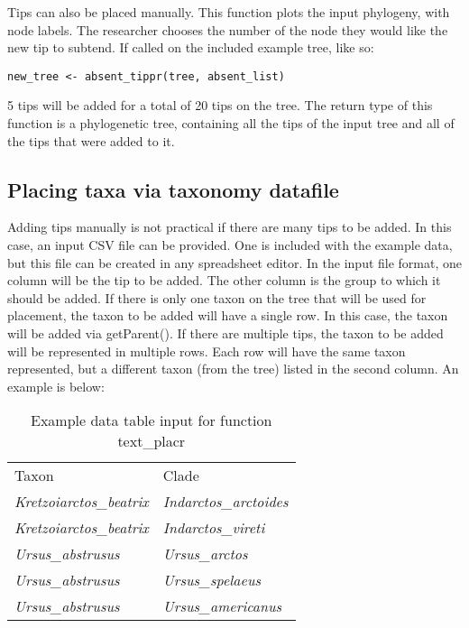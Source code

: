 Tips can also be placed manually. 
This function plots the input phylogeny, with node labels. 
The researcher chooses the number of the node they would like the new tip to subtend.
If called on the included example tree, like so:
{\tt \begin{snugshade*}
\begin{lstlisting}
new_tree <- absent_tippr(tree, absent_list)
\end{lstlisting}
\end{snugshade*}}

5 tips will be added for a total of 20 tips on the tree.
The return type of this function is a phylogenetic tree, containing all the tips of the input tree and all of the tips that were added to it.

\subsection{Placing taxa via taxonomy datafile}

Adding tips manually is not practical if there are many tips to be added.
In this case, an input CSV file can be provided.
One is included with the example data, but this file can be created in any spreadsheet editor.
In the input file format, one column will be the tip to be added.
The other column is the group to which it should be added.
If there is only one taxon on the tree that will be used for placement, the taxon to be added will have a single row.
In this case, the taxon will be added via getParent(). 
If there are multiple tips, the taxon to be added will be represented in multiple rows.
Each row will have the same taxon represented, but a different taxon (from the tree) listed in the second column.
An example is below:
\begin{table}
\centering
\begin{tabular}{ll}
Taxon                  & Clade                  \\ \cline{1-2}
\textit{Kretzoiarctos\_beatrix} & \textit{Indarctos\_arctoides}  \\
\textit{Kretzoiarctos\_beatrix} & \textit{Indarctos\_vireti}     \\
\textit{Ursus\_abstrusus}   & \textit{Ursus\_arctos}        \\
\textit{Ursus\_abstrusus}   & \textit{Ursus\_spelaeus}      \\
\textit{Ursus\_abstrusus}   & \textit{Ursus\_americanus}
\end{tabular}
\caption{Example data table input for function text\_placr}
\end{table}

